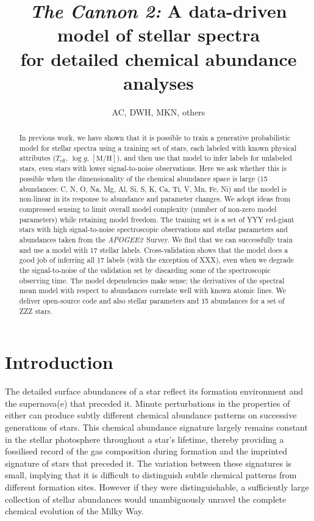 \documentclass[12pt,preprint]{aastex}
\newcommand{\project}[1]{\textsl{#1}}
\newcommand{\acronym}[1]{{\small{#1}}}
\newcommand{\apogee}{\project{\acronym{APOGEE2}}}
\newcommand{\logg}{\log g}
\newcommand{\mh}{\mathrm{[M/H]}}
\newcommand{\Teff}{T_{\mathrm{eff}}}
\begin{document}
\title{\textsl{The Cannon 2:} A data-driven model of stellar spectra \\
       for detailed chemical abundance analyses}
\author{AC, DWH, MKN, others}

\begin{abstract}
In previous work, we have shown that it is possible to train a generative
probabilistic model for stellar spectra using a training set of stars, each labeled with known
physical attributes ($\Teff$, $\logg$, $\mh$), and then use that model to infer labels for
unlabeled stars, even stars with lower signal-to-noise observations.
Here we ask whether this is possible when the dimensionality of the chemical
abundance space is large
(15 abundances: C, N, O, Na, Mg, Al, Si, S, K, Ca, Ti, V, Mn, Fe, Ni)
and the model is non-linear in its response to abundance and parameter changes.
We adopt ideas from compressed sensing to limit overall model complexity (number
of non-zero model parameters) while retaining model freedom.
The training set is a set of YYY red-giant stars with high signal-to-noise
spectroscopic observations and stellar parameters and abundances taken from the
\apogee\ Survey.
We find that we can successfully train and use a model with 17 stellar labels.
Cross-validation shows that the model does a good job of inferring all 17 labels
(with the exception of XXX), even when we degrade the signal-to-noise of the
validation set by discarding some of the spectroscopic observing time.
The model dependencies make sense; the derivatives of the spectral mean model
with respect to abundances correlate well with known atomic lines.
We deliver open-source code and also stellar parameters and 15 abundances for a
set of ZZZ stars.
\end{abstract}

\section{Introduction}


The detailed surface abundances of a star reflect its formation environment
and the supernova(e) that preceded it.  Minute perturbations in the properties
of either can produce subtly different chemical abundance patterns on successive
generations of stars.  This chemical abundance signature largely remains 
constant in the stellar photosphere throughout a star's lifetime, thereby 
providing a fossilised record of the gas composition during formation and the 
imprinted signature of stars that preceded it.  The variation between these
signatures is small, implying that it is difficult to distinguish subtle 
chemical patterns from different formation sites.  However if they were 
distinguishable, a sufficiently large collection of stellar abundances would 
unambiguously unravel the complete chemical evolution of the Milky Way.
\end{document}
